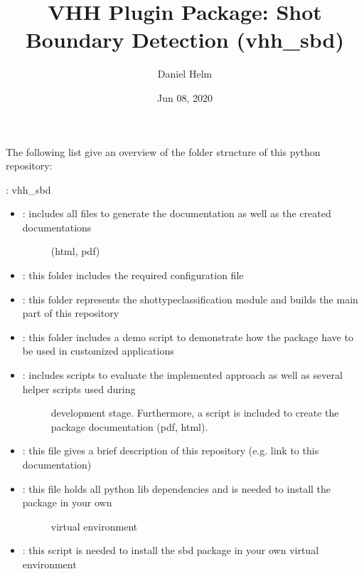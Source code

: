 \documentclass[letterpaper,10pt,english,openany,oneside]{sphinxmanual}
\title{VHH Plugin Package: Shot Boundary Detection (vhh\_sbd)}
\date{Jun 08, 2020}
\author{Daniel Helm}
\begin{document}
\pagestyle{empty}
\sphinxmaketitle
\pagestyle{plain}
\sphinxtableofcontents
\pagestyle{normal}
\label{\detokenize{index::doc}}


The following list give an overview of the folder structure of this python repository:

: vhh\_sbd
\begin{itemize}
\item {} \begin{description}
\item[{: includes all files to generate the documentation as well as the created documentations}] \leavevmode
(html, pdf)

\end{description}

\item {} 
: this folder includes the required configuration file

\item {} 
: this folder represents the shot\sphinxhyphen{}type\sphinxhyphen{}classification module and builds the main part of this repository

\item {} 
: this folder includes a demo script to demonstrate how the package have to be used in customized applications

\item {} \begin{description}
\item[{: includes scripts to evaluate the implemented approach as well as several helper scripts used during}] \leavevmode
development stage. Furthermore, a script is included to create the package documentation (pdf, html).

\end{description}

\item {} 
: this file gives a brief description of this repository (e.g. link to this documentation)

\item {} \begin{description}
\item[{: this file holds all python lib dependencies and is needed to install the package in your own}] \leavevmode
virtual environment

\end{description}

\item {} 
: this script is needed to install the sbd package in your own virtual environment

\end{itemize}
\end{document}
